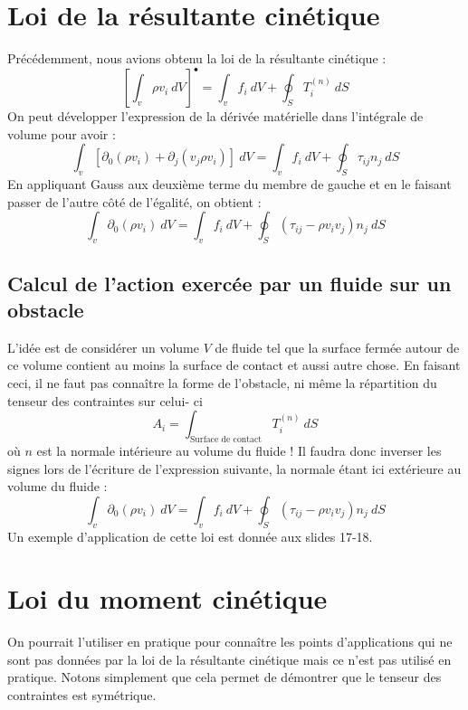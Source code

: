     

\section{Loi de la résultante cinétique}
Précédemment, nous avions obtenu la loi de la résultante cinétique :
\begin{equation}
\left[\int_v \rho v_i\ dV\right]^\bullet = \int_v f_i\ dV + \oint_S T_i^{(n)}\ dS
\end{equation}
On peut développer l'expression de la dérivée matérielle dans l'intégrale de volume pour avoir :
\begin{equation}
\int_v [\partial_0(\rho v_i) + \partial_j(v_j\rho v_i)]\ dV = \int_v f_i\ dV + \oint_S \tau_{ij}n_j\ dS
\end{equation}
En appliquant Gauss aux deuxième terme du membre de gauche et en le faisant passer de l'autre côté 
de l'égalité, on obtient :
\begin{equation}
\int_v \partial_0(\rho v_i)\ dV = \int_v f_i\ dV + \oint_S (\tau_{ij} - \rho v_i v_j)n_j\ dS
\end{equation}

    
    \subsection{Calcul de l'action exercée par un fluide sur un obstacle}
    L'idée est de considérer un volume $V$ de fluide tel que la surface fermée autour de ce volume
    contient au moins la surface de contact et aussi autre chose. En faisant ceci, il ne faut pas
    connaître la forme de l'obstacle, ni même la répartition du tenseur des contraintes sur celui-
    ci 
    \begin{equation}
    A_i = \int_{\text{Surface de contact}} T_i^{(n)}\ dS
    \end{equation}
    où $n$ est la normale intérieure au volume du fluide ! Il faudra donc inverser les signes lors
    de l'écriture de l'expression suivante, la normale étant ici extérieure au volume du fluide :
    \begin{equation}
    \int_v \partial_0(\rho v_i)\ dV = \int_v f_i\ dV + \oint_S (\tau_{ij} - \rho v_i v_j)n_j\ dS
    \end{equation}
    Un exemple d'application de cette loi est donnée aux slides 17-18.




\section{Loi du moment cinétique}
On pourrait l'utiliser en pratique pour connaître les points d'applications qui ne sont pas données
par la loi de la résultante cinétique mais ce n'est pas utilisé en pratique. Notons simplement que
cela permet de démontrer que le tenseur des contraintes est symétrique.


